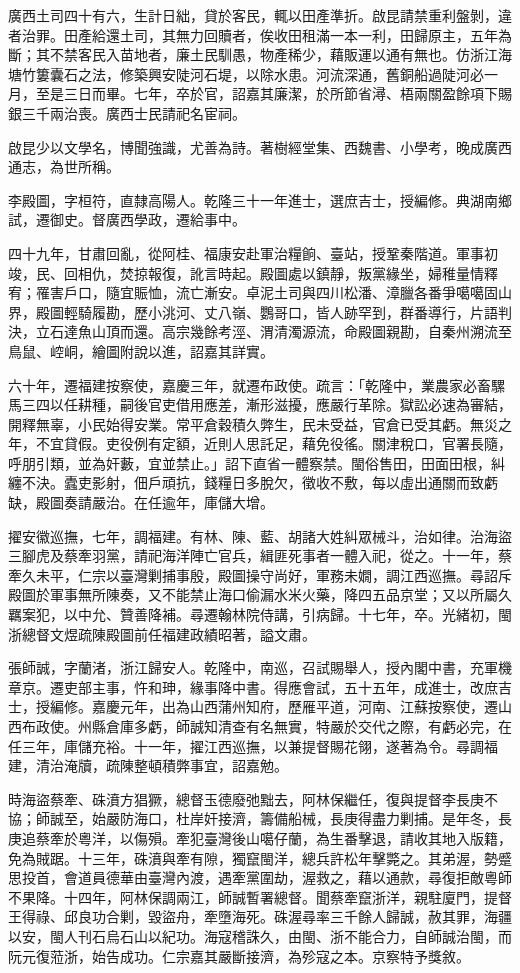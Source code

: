 \begin{pinyinscope}
廣西土司四十有六，生計日絀，貸於客民，輒以田產準折。啟昆請禁重利盤剝，違者治罪。田產給還土司，其無力回贖者，俟收田租滿一本一利，田歸原主，五年為斷；其不禁客民入苗地者，廉土民馴愚，物產稀少，藉販運以通有無也。仿浙江海塘竹簍囊石之法，修築興安陡河石堤，以除水患。河流深通，舊銅船過陡河必一月，至是三日而畢。七年，卒於官，詔嘉其廉潔，於所節省潯、梧兩關盈餘項下賜銀三千兩治喪。廣西士民請祀名宦祠。

啟昆少以文學名，博聞強識，尤善為詩。著樹經堂集、西魏書、小學考，晚成廣西通志，為世所稱。

李殿圖，字桓符，直隸高陽人。乾隆三十一年進士，選庶吉士，授編修。典湖南鄉試，遷御史。督廣西學政，遷給事中。

四十九年，甘肅回亂，從阿桂、福康安赴軍治糧餉、臺站，授鞏秦階道。軍事初竣，民、回相仇，焚掠報復，訛言時起。殿圖處以鎮靜，叛黨緣坐，婦稚量情釋宥；罹害戶口，隨宜賑恤，流亡漸安。卓泥土司與四川松潘、漳臘各番爭噶噶固山界，殿圖輕騎履勘，歷小洮河、丈八嶺、鸚哥口，皆人跡罕到，群番導行，片語判決，立石達魚山頂而還。高宗幾餘考涇、渭清濁源流，命殿圖親勘，自秦州溯流至鳥鼠、崆峒，繪圖附說以進，詔嘉其詳實。

六十年，遷福建按察使，嘉慶三年，就遷布政使。疏言：「乾隆中，業農家必畜騾馬三四以任耕種，嗣後官吏借用應差，漸形滋擾，應嚴行革除。獄訟必速為審結，開釋無辜，小民始得安業。常平倉穀積久弊生，民未受益，官倉已受其虧。無災之年，不宜貸假。吏役例有定額，近則人思託足，藉免役徭。關津稅口，官署長隨，呼朋引類，並為奸藪，宜並禁止。」詔下直省一體察禁。閩俗售田，田面田根，糾纏不決。蠹吏影射，佃戶頑抗，錢糧日多脫欠，徵收不敷，每以虛出通關而致虧缺，殿圖奏請嚴治。在任逾年，庫儲大增。

擢安徽巡撫，七年，調福建。有林、陳、藍、胡諸大姓糾眾械斗，治如律。治海盜三腳虎及蔡牽羽黨，請祀海洋陣亡官兵，緝匪死事者一體入祀，從之。十一年，蔡牽久未平，仁宗以臺灣剿捕事殷，殿圖操守尚好，軍務未嫺，調江西巡撫。尋詔斥殿圖於軍事無所陳奏，又不能禁止海口偷漏水米火藥，降四五品京堂；又以所屬久羈案犯，以中允、贊善降補。尋遷翰林院侍講，引病歸。十七年，卒。光緒初，閩浙總督文煜疏陳殿圖前任福建政績昭著，謚文肅。

張師誠，字蘭渚，浙江歸安人。乾隆中，南巡，召試賜舉人，授內閣中書，充軍機章京。遷吏部主事，忤和珅，緣事降中書。得應會試，五十五年，成進士，改庶吉士，授編修。嘉慶元年，出為山西蒲州知府，歷雁平道，河南、江蘇按察使，遷山西布政使。州縣倉庫多虧，師誠知清查有名無實，特嚴於交代之際，有虧必完，在任三年，庫儲充裕。十一年，擢江西巡撫，以兼提督賜花翎，遂著為令。尋調福建，清治淹牘，疏陳整頓積弊事宜，詔嘉勉。

時海盜蔡牽、硃濆方猖獗，總督玉德廢弛黜去，阿林保繼任，復與提督李長庚不協；師誠至，始嚴防海口，杜岸奸接濟，籌備船械，長庚得盡力剿捕。是年冬，長庚追蔡牽於粵洋，以傷殞。牽犯臺灣後山噶仔蘭，為生番擊退，請收其地入版籍，免為賊踞。十三年，硃濆與牽有隙，獨竄閩洋，總兵許松年擊斃之。其弟渥，勢蹙思投首，會道員德華由臺灣內渡，遇牽黨圍劫，渥救之，藉以通款，尋復拒敵粵師不果降。十四年，阿林保調兩江，師誠暫署總督。聞蔡牽竄浙洋，親駐廈門，提督王得祿、邱良功合剿，毀盜舟，牽墮海死。硃渥尋率三千餘人歸誠，赦其罪，海疆以安，閩人刊石烏石山以紀功。海寇稽誅久，由閩、浙不能合力，自師誠治閩，而阮元復蒞浙，始告成功。仁宗嘉其嚴斷接濟，為殄寇之本。京察特予獎敘。


\end{pinyinscope}
